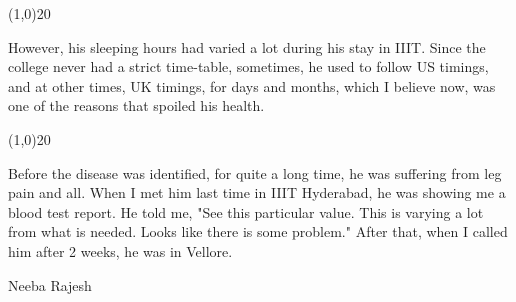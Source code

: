 \begin{english}
\begin{center}
\line(1,0){20} 
\end{center}
However, his sleeping hours had varied a lot during his stay in IIIT. Since the college never had a strict time-table, sometimes, he used to follow US timings, and at other times, UK timings, for days and months, which I believe now, was one of the reasons that spoiled his health.
\begin{center}
\line(1,0){20} 
\end{center}
Before the disease was identified, for quite a long time, he was suffering from leg pain and all. When I met him last time in IIIT Hyderabad, he was showing me a blood test report. He told me, "See this particular value. This is varying a lot from what is needed. Looks like there is some problem." After that, when I called him after 2 weeks, he was in Vellore.

\begin{flushright}Neeba Rajesh\end{flushright}
\end{english}
\newpage

